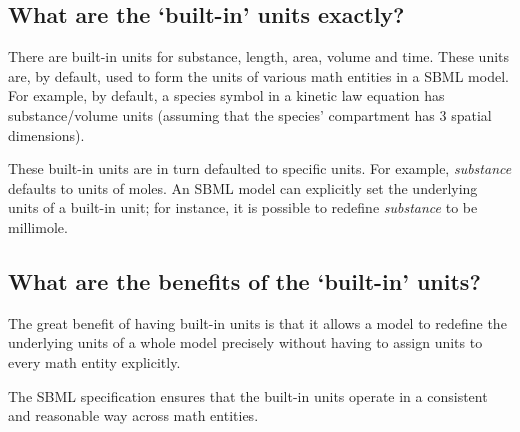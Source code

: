 \documentclass{sbmlfaq}
\begin{document}
\subsection{What are the `built-in' units exactly?}

There are built-in units for substance, length, area, volume and time.  These units
are, by default, used to form the units of various math entities in a SBML model.
For example, by default, a species symbol in a kinetic law equation has substance/volume 
units (assuming that the species' compartment has 3 spatial dimensions).

These built-in units are in turn defaulted to specific units.  For example,
\emph{substance} defaults to units of moles.  An SBML model can explicitly
set the underlying units of a built-in unit; for instance, it is possible
to redefine \emph{substance} to be millimole.


\subsection{What are the benefits of the `built-in' units?}

The great benefit of having built-in units is that it allows
a model to redefine the underlying units of a whole model
precisely without having to assign units to every math entity explicitly.

The SBML specification ensures that the built-in units operate in a consistent
and reasonable way across math entities.
\end{document}
